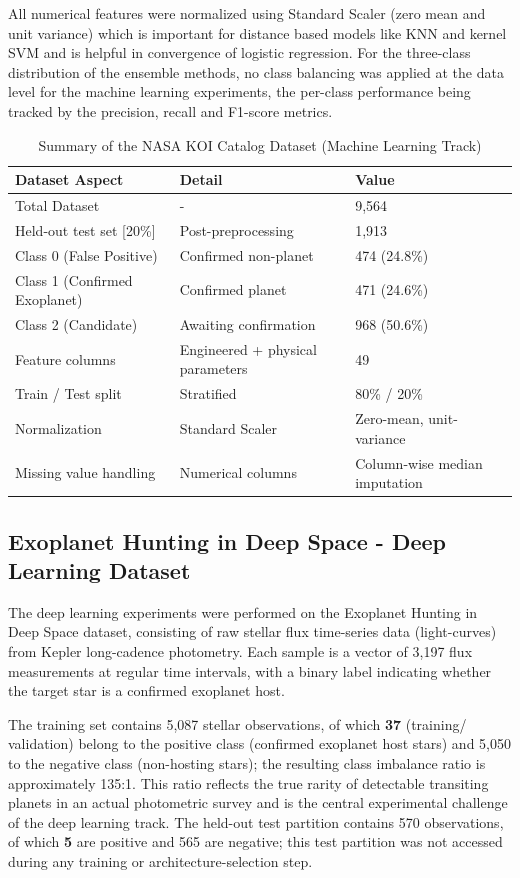 \documentclass[preprint,11pt,times]{elsarticle}
\begin{document}
All numerical features were normalized using Standard Scaler (zero mean and unit variance) which is important for distance based models like KNN and kernel SVM and is helpful in convergence of logistic regression. For the three-class distribution of the ensemble methods, no class balancing was applied at the data level for the machine learning experiments, the per-class performance being tracked by the precision, recall and F1-score metrics.

\begin{table}[h]
\caption{Summary of the NASA KOI Catalog Dataset (Machine Learning Track)}\label{tab1}%
\begin{tabular}{@{}lll@{}}
\toprule
Dataset Aspect & Detail & Value \\
\midrule
Total Dataset & -  & 9,564 \\
Held-out test set [20\%]& Post-preprocessing & 1,913 \\
Class 0 (False Positive) & Confirmed non-planet & 474 (24.8\%) \\
Class 1 (Confirmed Exoplanet) & Confirmed planet & 471 (24.6\%) \\
Class 2 (Candidate) & Awaiting confirmation & 968 (50.6\%) \\
Feature columns & Engineered + physical parameters & 49 \\
Train / Test split & Stratified & 80\% / 20\% \\
Normalization & Standard Scaler & Zero-mean, unit-variance \\
Missing value handling & Numerical columns & Column-wise median imputation \\
\bottomrule
\end{tabular}
\end{table}

\subsection{Exoplanet Hunting in Deep Space - Deep Learning Dataset}\label{subsec3b}

The deep learning experiments were performed on the Exoplanet Hunting in Deep Space dataset, consisting of raw stellar flux time-series data (light-curves) from Kepler long-cadence photometry. Each sample is a vector of 3,197 flux measurements at regular time intervals, with a binary label indicating whether the target star is a confirmed exoplanet host.

The training set contains 5,087 stellar observations, of which \textbf{37}   (training/ validation) belong to the positive class (confirmed exoplanet host stars) and 5,050 to the negative class (non-hosting stars); the resulting class imbalance ratio is approximately 135:1. This ratio reflects the true rarity of detectable transiting planets in an actual photometric survey and is the central experimental challenge of the deep learning track. The held-out test partition contains 570 observations, of which \textbf{5} are positive and 565 are negative; this test partition was not accessed during any training or architecture-selection step.
\end{document}
